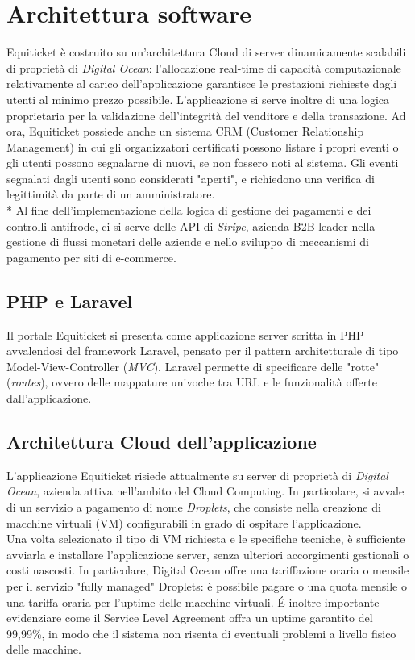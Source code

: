 \section{Architettura software}
Equiticket è costruito su un'architettura Cloud di server dinamicamente scalabili di proprietà di \textit{Digital Ocean}: l'allocazione real-time di capacità computazionale relativamente al carico dell'applicazione garantisce le prestazioni richieste dagli utenti al minimo prezzo possibile.  
L'applicazione si serve inoltre di una logica proprietaria per la validazione dell'integrità del venditore e della transazione. Ad ora, Equiticket possiede anche un sistema CRM (Customer Relationship Management) in cui gli organizzatori certificati possono listare i propri eventi o gli utenti possono segnalarne di nuovi, se non fossero noti al sistema. Gli eventi segnalati dagli utenti sono considerati "aperti", e richiedono una verifica di legittimità da parte di un amministratore. \\*
Al fine dell'implementazione della logica di gestione dei pagamenti e dei controlli antifrode, ci si serve delle API di \textit{Stripe}, azienda B2B leader nella gestione di flussi monetari delle aziende e nello sviluppo di meccanismi di pagamento per siti di e-commerce. 
\subsection{PHP e Laravel}
Il portale Equiticket si presenta come applicazione server scritta in PHP avvalendosi del framework Laravel, pensato per il pattern architetturale di tipo Model-View-Controller (\textit{MVC}).
Laravel permette di specificare delle "rotte" (\textit{routes}), ovvero delle mappature univoche tra URL e le funzionalità offerte dall'applicazione. 
\subsection{Architettura Cloud dell'applicazione}
L'applicazione Equiticket risiede attualmente su server di proprietà di \textit{Digital Ocean}, azienda attiva nell'ambito del Cloud Computing. In particolare, si avvale di un servizio a pagamento di nome \textit{Droplets}, che consiste nella creazione di macchine virtuali (VM) configurabili in grado di ospitare l'applicazione. \\
Una volta selezionato il tipo di VM richiesta e le specifiche tecniche, è sufficiente avviarla e  installare l'applicazione server, senza ulteriori accorgimenti gestionali o costi nascosti. In particolare, Digital Ocean offre una tariffazione oraria o mensile per il servizio "fully managed" Droplets: è possibile pagare o una quota mensile o una tariffa oraria per l'uptime delle macchine virtuali. \'E inoltre importante evidenziare come il Service Level Agreement offra un uptime garantito del 99,99\%, in modo che il sistema non risenta di eventuali problemi a livello fisico delle macchine. 
